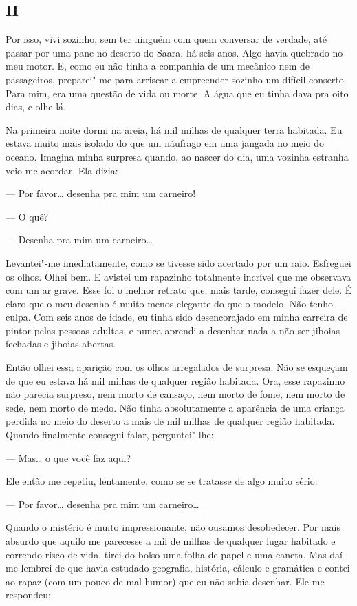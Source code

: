 \begin{Parallel}[p]{}{}
{\medskip

\section{II}

Por isso, vivi sozinho, sem ter ninguém com quem conversar de verdade,
até passar por uma pane no deserto do Saara, há seis anos. Algo havia
quebrado no meu motor. E, como eu não tinha a companhia de um mecânico
nem de passageiros, preparei"-me para arriscar a empreender sozinho um
difícil conserto. Para mim, era uma questão de vida ou morte. A água que
eu tinha dava pra oito dias, e olhe lá.

Na primeira noite dormi na areia, há mil milhas de qualquer terra
habitada. Eu estava muito mais isolado do que um náufrago em uma jangada
no meio do oceano. Imagina minha surpresa quando, ao nascer do dia, uma
vozinha estranha veio me acordar. Ela dizia:

--- Por favor\ldots{} desenha pra mim um carneiro!

--- O quê?

--- Desenha pra mim um carneiro\ldots{}

Levantei"-me imediatamente, como se tivesse sido acertado por um raio.
Esfreguei os olhos. Olhei bem. E avistei um rapazinho totalmente
incrível que me observava com um ar grave. Esse foi o melhor retrato
que, mais tarde, consegui fazer dele. É claro que o meu desenho é muito
menos elegante do que o modelo. Não tenho culpa. Com seis anos de idade,
eu tinha sido desencorajado em minha carreira de pintor pelas pessoas
adultas, e nunca aprendi a desenhar nada a não ser jiboias fechadas e
jiboias abertas.

Então olhei essa aparição com os olhos arregalados de surpresa. Não se
esqueçam de que eu estava há mil milhas de qualquer região habitada.
Ora, esse rapazinho não parecia surpreso, nem morto de cansaço, nem
morto de fome, nem morto de sede, nem morto de medo. Não tinha
absolutamente a aparência de uma criança perdida no meio do deserto a
mais de mil milhas de qualquer região habitada. Quando finalmente
consegui falar, perguntei"-lhe:

--- Mas\ldots{} o que você faz aqui?

Ele então me repetiu, lentamente, como se se tratasse de algo muito
sério:

--- Por favor\ldots{} desenha pra mim um carneiro\ldots{}

Quando o mistério é muito impressionante, não ousamos desobedecer. Por
mais absurdo que aquilo me parecesse a mil de milhas de qualquer lugar
habitado e correndo risco de vida, tirei do bolso uma folha de papel e
uma caneta. Mas daí me lembrei de que havia estudado geografia,
história, cálculo e gramática e contei ao rapaz (com um pouco de mal
humor) que eu não sabia desenhar. Ele me respondeu:

}
\end{Parallel}
